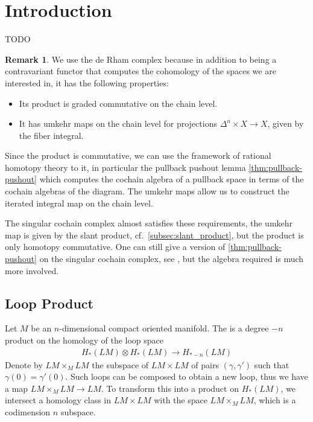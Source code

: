 \documentclass{scrartcl}
\let\emph\relax
\newcommand{\emphi}[1]{\index{#1}\emph{#1}}
\theoremstyle{plain}
\theoremstyle{definition}
\newtheorem{remark}[theorem]{Remark}
\begin{document}
\tableofcontents

\section{Introduction}
TODO

\begin{remark}
    We use the de Rham complex because in addition to being a contravariant functor that computes the cohomology of the spaces we are interested in, it has the following properties: 
    \begin{itemize}
        \item Its product is graded commutative on the chain level.
        \item It has umkehr maps on the chain level for projections $\Delta^n \times X\to X$, given by the fiber integral. 
    \end{itemize}
    Since the product is commutative, we can use the framework of rational homotopy theory to it, in particular the pullback pushout lemma \cref{thm:pullback-pushout} which computes the cochain algebra of a pullback space in terms of the cochain algebras of the diagram. The umkehr maps allow us to construct the iterated integral map on the chain level.

    The singular cochain complex almost satisfies these requirements, the umkehr map is given by the slant product, cf.\ \cref{subsec:slant_product}, but the product is only homotopy commutative. One can still give a version of \cref{thm:pullback-pushout} on the singular cochain complex, see \cite{toen2020probl}, 
    but the algebra required is much more involved. 
\end{remark}


\subsection{Loop Product}\label{subsec:loop-product-classical}
Let $M$ be an $n$-dimensional compact oriented manifold. The \emphi{loop product} is a degree $-n$ product on the homology of the loop space 
\begin{align*}
    H_*(LM)\otimes H_*(LM)\to H_{*-n}(LM)
\end{align*}
Denote by $LM\times_M LM$ the subspace of $LM\times LM$ of pairs $(\gamma, \gamma')$ such that $\gamma(0) = \gamma'(0)$. Such loops can be composed to obtain a new loop, thus we have a map $LM\times_M LM\to LM$. To transform this into a product on $H_*(LM)$, we intersect a homology class in $LM\times LM$ with the space $LM\times_M LM$, which is a codimension $n$ subspace.
\end{document}
